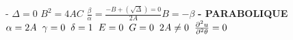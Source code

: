 \documentclass{article}
\begin{document}
    - 
    $\Delta=0$ \hspace*{0.2cm} $B^2=4AC$ \hspace*{0.2cm}$\frac{\beta}{\alpha}=\frac{-B+(\sqrt{\Delta})=0}{2A}$\hspace*{0.2cm}$B=-\beta$
    \hspace*{0.5cm}\textbf{ - PARABOLIQUE}\\
    \hspace*{1.4cm} $\alpha=2A \hspace*{0.2cm} \gamma =0\hspace*{0.2cm}  \delta=1\hspace*{0.2cm}  E=0\hspace*{0.2cm}  G=0\hspace*{0.2cm}  2A\neq 0\hspace*{0.2cm}  \frac{\partial^2u}{\partial^2\theta}=0$\\\\
\end{document}
